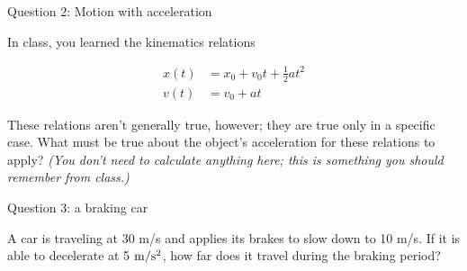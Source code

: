 \documentclass[12pt]{article}
\begin{document}
\vspace{3in}
\newpage
\centerline{\Large Question 2: Motion with acceleration}

In class, you learned the kinematics relations

\begin{align*}
x(t) &= x_0 + v_0t + \frac{1}{2}at^2 \\
v(t) &= v_0 + at
\end{align*}

These relations aren't generally true, however; they are true only in a specific case. What must be true about the object's acceleration for these relations to apply? {\it (You don't need to calculate anything here; this is something you should remember from class.)}

\vspace{1.2in}
\newpage





\newpage


\centerline{\Large Question 3: a braking car}

A car is traveling at 30 m/s and applies its brakes to slow down to 10 m/s. If it is able to decelerate at 5 $\rm m/\rm s^2$, how far does it travel during the braking period?
\end{document}
